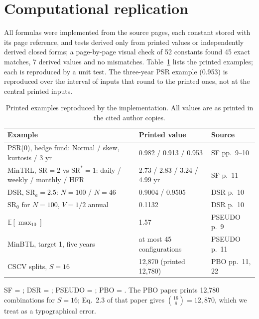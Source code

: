 \documentclass[11pt,a4paper]{article}
\newcommand{\SR}{\mathrm{SR}}
\newcommand{\E}{\mathbb{E}}
\theoremstyle{remark}
\begin{document}
\section{Computational replication}\label{sec:replication}

All formulas were implemented from the source pages, each constant stored with its page reference, and tests derived only from printed values or independently derived closed forms; a page-by-page visual check of 52 constants found 45 exact matches, 7 derived values and no mismatches. Table~\ref{tab:replication} lists the printed examples; each is reproduced by a unit test. The three-year PSR example (0.953) is reproduced over the interval of inputs that round to the printed ones, not at the central printed inputs.

\begin{table}[t]
\centering\footnotesize
\caption{Printed examples reproduced by the implementation. All values are as printed in the cited author copies.}\label{tab:replication}
\begin{tabular}{@{}lll@{}}
\toprule
Example & Printed value & Source \\
\midrule
PSR(0), hedge fund: Normal / skew, kurtosis / 3 yr & 0.982 / 0.913 / 0.953 & SF pp.~9--10 \\
MinTRL, $\SR=2$ vs $\SR^\ast=1$: daily / weekly / monthly / HFR & 2.73 / 2.83 / 3.24 / 4.99 yr & SF p.~11 \\
DSR, $\SR_a=2.5$: $N=100$ / $N=46$ & 0.9004 / 0.9505 & DSR p.~10 \\
$\SR_0$ for $N=100$, $V=1/2$ annual & 0.1132 & DSR p.~10 \\
$\E[\max_{10}]$ & 1.57 & PSEUDO p.~9 \\
MinBTL, target 1, five years & at most 45 configurations & PSEUDO p.~11 \\
CSCV splits, $S=16$ & 12,870 (printed 12,780) & PBO pp.~11, 22 \\
\bottomrule
\end{tabular}
\par\smallskip\raggedright\footnotesize SF = \citet{bailey2012frontier}; DSR = \citet{bailey2014dsr}; PSEUDO = \citet{bailey2014pseudo}; PBO = \citet{bailey2017pbo}. The PBO paper prints 12,780 combinations for $S=16$; Eq.~2.3 of that paper gives $\binom{16}{8}=12{,}870$, which we treat as a typographical error.
\end{table}
\end{document}
